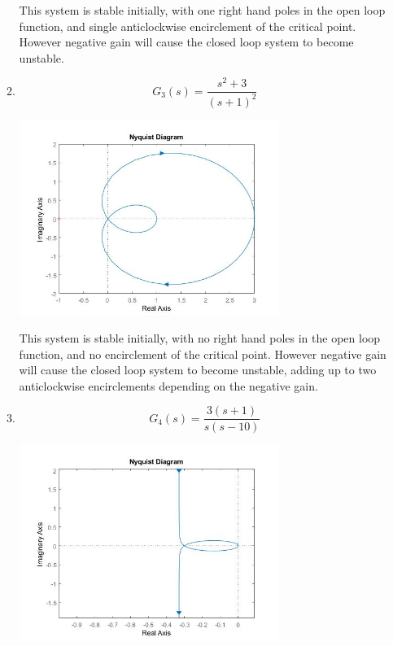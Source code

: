 \documentclass[a4paper,11pt]{article}
\begin{document}
\begin{preview}
\begin{enumerate}
\begin{enumerate}
      This system is stable initially, with one right hand poles in the open loop function, and single anticlockwise encirclement of the critical point. However negative gain will cause the closed loop system to become unstable.\\


      \item $$ G_3 (s) = \frac{ s^2+3 }{ (s+1)^2 } $$

      \begin{center}
        \includegraphics[width=0.7\textwidth]{A_1/1_c.jpg}
      \end{center}

      
      This system is stable initially, with no right hand poles in the open loop function, and no encirclement of the critical point. However negative gain will cause the closed loop system to become unstable, adding up to two anticlockwise encirclements depending on the negative gain.\\


      \item $$ G_4 (s) = \frac{ 3(s+1) }{ s(s-10) } $$

      \begin{center}
        \includegraphics[width=0.7\textwidth]{A_1/1_d.jpg}
      \end{center}


\end{enumerate}
\end{enumerate}
\end{preview}
\end{document}
